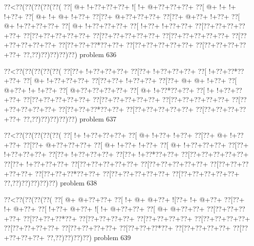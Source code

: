 \vbox{\vbox{\goo
\0??<\0??(\0??(\0??(\0??(\0??(
\0??[\- @+\- !+\0??+\0??+\0??+
\- ![\- !+\- @+\0??+\0??+\0??+
\0??[\- @+\- !+\- !+\- !+\0??+
\0??[\- @+\- !+\- @+\- !+\0??+
\0??[\0??+\- @+\0??+\0??+\0??+
\0??[\0??+\- @+\0??+\- !+\0??+
\0??[\- @+\- !+\0??+\0??+\0??+
\0??[\- @+\- !+\0??+\0??+\0??+
\0??[\- !+\0??+\- !+\0??+\0??+
\0??[\0??+\0??+\0??+\0??+\0??+
\0??[\0??+\0??+\0??+\0??+\0??+
\0??[\0??+\0??+\0??+\0??+\0??+
\0??[\0??+\0??+\0??+\0??+\0??+
\0??[\0??+\0??+\0??+\0??+\0??+
\0??[\0??+\0??+\0??*\0??+\0??+
\0??[\0??+\0??+\0??+\0??+\0??+
\0??[\0??+\0??+\0??+\0??+\0??+
\0??,\0??)\0??)\0??)\0??)\0??)
}
\hfil problem 636\hfil\break
}

\vbox{\vbox{\goo
\0??<\0??(\0??(\0??(\0??(\0??(
\0??[\0??+\- !+\0??+\0??+\0??+
\0??[\0??+\- !+\0??+\0??+\0??+
\0??[\- !+\0??+\0??*\0??+\0??+
\0??[\- @+\- !+\0??+\0??+\0??+
\0??[\0??+\0??+\- !+\0??+\0??+
\0??[\0??+\- @+\- @+\- !+\0??+
\0??[\- @+\0??+\- !+\- !+\0??+
\0??[\- @+\0??+\0??+\0??+\0??+
\0??[\- @+\- !+\0??*\0??+\0??+
\0??[\- !+\- !+\0??+\0??+\0??+
\0??[\0??+\0??+\0??+\0??+\0??+
\0??[\0??+\0??+\0??+\0??+\0??+
\0??[\0??+\0??+\0??+\0??+\0??+
\0??[\0??+\0??+\0??+\0??+\0??+
\0??[\0??+\0??+\0??*\0??+\0??+
\0??[\0??+\0??+\0??+\0??+\0??+
\0??[\0??+\0??+\0??+\0??+\0??+
\0??,\0??)\0??)\0??)\0??)\0??)
}
\hfil problem 637\hfil\break
}

\vbox{\vbox{\goo
\0??<\0??(\0??(\0??(\0??(\0??(
\0??[\- !+\- !+\0??+\0??+\0??+
\0??[\- @+\- !+\0??+\- !+\0??+
\0??[\0??+\- @+\- !+\0??+\0??+
\0??[\0??+\- @+\0??+\0??+\0??+
\0??[\- @+\- !+\0??+\- !+\0??+
\0??[\- @+\- !+\0??+\0??+\0??+
\0??[\0??+\- !+\0??+\0??+\0??+
\0??[\0??+\- !+\0??+\0??+\0??+
\0??[\0??+\- !+\0??*\0??+\0??+
\0??[\0??+\0??+\0??+\0??+\0??+
\0??[\0??+\- !+\0??+\0??+\0??+
\0??[\0??+\0??+\0??+\0??+\0??+
\0??[\0??+\0??+\0??+\0??+\0??+
\0??[\0??+\0??+\0??+\0??+\0??+
\0??[\0??+\0??+\0??*\0??+\0??+
\0??[\0??+\0??+\0??+\0??+\0??+
\0??[\0??+\0??+\0??+\0??+\0??+
\0??,\0??)\0??)\0??)\0??)\0??)
}
\hfil problem 638\hfil\break
}

\vbox{\vbox{\goo
\0??<\0??(\0??(\0??(\0??(
\0??[\- @+\- @+\0??+\0??+
\0??[\- !+\- @+\- @+\0??+
\- ![\0??+\- !+\- @+\0??+
\0??[\0??+\- !+\- @+\0??+
\0??[\- !+\0??+\- @+\0??+
\- ![\- !+\- @+\0??+\0??+
\0??[\- @+\- @+\0??+\0??+
\0??[\0??+\0??+\0??+\0??+
\0??[\0??+\0??+\0??*\0??+
\0??[\0??+\0??+\0??+\0??+
\0??[\0??+\0??+\0??+\0??+
\0??[\0??+\0??+\0??+\0??+
\0??[\0??+\0??+\0??+\0??+
\0??[\0??+\0??+\0??+\0??+
\0??[\0??+\0??+\0??*\0??+
\0??[\0??+\0??+\0??+\0??+
\0??[\0??+\0??+\0??+\0??+
\0??,\0??)\0??)\0??)\0??)
}
\hfil problem 639\hfil\break
}

